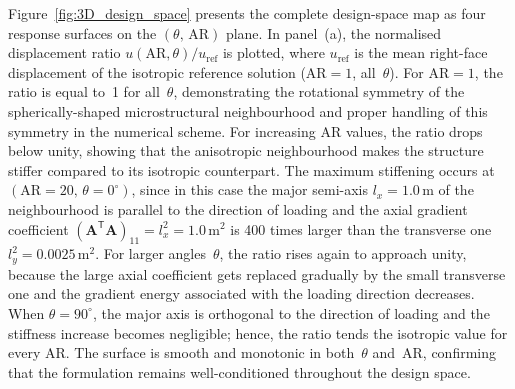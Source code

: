 \documentclass[final,3p,times,fleqn]{elsarticle}
\begin{document}

Figure~\ref{fig:3D_design_space} presents the complete design-space
map as four response surfaces on the
$(\theta,\,\mathrm{AR})$ plane.
In panel~(a), the normalised displacement ratio
$u(\mathrm{AR},\theta)/u_{\mathrm{ref}}$ is plotted, where $u_{\mathrm{ref}}$
is the mean right-face displacement of the isotropic reference solution
($\mathrm{AR}=1$, all~$\theta$). For $\mathrm{AR}=1$, the ratio is equal to~1
for all~$\theta$, demonstrating the rotational symmetry of the spherically-shaped
microstructural neighbourhood and proper handling of this symmetry in the
numerical scheme.
For increasing AR values, the ratio drops below unity, showing
that the anisotropic neighbourhood makes the structure stiffer compared to
its isotropic counterpart.
The maximum stiffening occurs at
$(\mathrm{AR}=20,\,\theta=0^{\circ})$, since in this case the major semi-axis 
$l_{x} = 1.0$\,m of the neighbourhood is parallel to the direction of loading
and the axial gradient coefficient $(\mathbf{A}^{\mathsf{T}}\mathbf{A})_{11}
=l_{x}^{2} = 1.0$\,m$^{2}$ is 400 times larger than the transverse one 
$l_{y}^{2} = 0.0025$\,m$^{2}$.
For larger angles~$\theta$, the ratio rises again to approach unity, because the
large axial coefficient gets replaced gradually by the small transverse one
and the gradient energy associated with the loading direction decreases.
When $\theta = 90^{\circ}$, the major axis is orthogonal to the direction of
loading and the stiffness increase becomes negligible; hence, the ratio tends the isotropic value for every AR.
The surface is smooth and monotonic in both~$\theta$ and~AR,
confirming that the formulation remains well-conditioned throughout
the design space.
\end{document}
